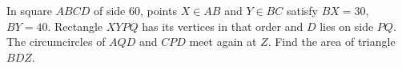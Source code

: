 In square $ABCD$ of side $60$, points $X\in AB$ and $Y\in BC$ satisfy $BX=30$, $BY=40$. Rectangle $XYPQ$ has its vertices in that order and $D$ lies on side $PQ$. The circumcircles of $AQD$ and $CPD$ meet again at $Z$. Find the area of triangle $BDZ$.
